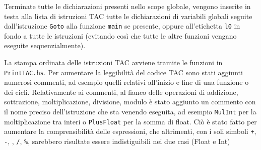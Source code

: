
Terminate tutte le dichiarazioni presenti nello scope globale, vengono inserite in testa alla lista di istruzioni TAC tutte le dichiarazioni di variabili globali seguite dall'istruzione {\tt Goto} alla funzione {\tt main} se presente, oppure all'etichetta {\tt l0} in fondo a tutte le istruzioni (evitando così che tutte le altre funzioni vengano eseguite sequenzialmente).

La stampa ordinata delle istruzioni TAC avviene tramite le funzioni in {\tt PrintTAC.hs}. Per aumentare la leggibilità del codice TAC sono stati aggiunti numerosi commenti, ad esempio quelli relativi all'inizio e fine di una funzione o dei cicli. Relativamente ai commenti, al fianco delle operazioni di addizione, sottrazione, moltiplicazione, divisione, modulo è stato aggiunto un commento con il nome preciso dell'istruzione che sta venendo eseguita, ad esempio {\tt MulInt} per la moltiplicazione tra interi o {\tt PlusFloat} per la somma di float. Ciò è stato fatto per aumentare la comprensibilità delle espressioni, che altrimenti, con i soli simboli {\tt +}, {\tt -}, {\tt *}, {\tt /}, {\tt \%}, sarebbero risultate essere indistiguibili nei due casi (Float e Int)